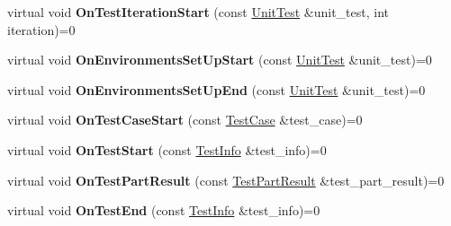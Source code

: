 \begin{DoxyCompactItemize}
\item 
\hypertarget{classtesting_1_1_test_event_listener_a60cc09b7907cb329d152eb5e7133bdeb}{}virtual void {\bfseries On\+Test\+Iteration\+Start} (const \hyperlink{classtesting_1_1_unit_test}{Unit\+Test} \&unit\+\_\+test, int iteration)=0\label{classtesting_1_1_test_event_listener_a60cc09b7907cb329d152eb5e7133bdeb}

\item 
\hypertarget{classtesting_1_1_test_event_listener_aa6502e534919605be45f26a6daf9a40c}{}virtual void {\bfseries On\+Environments\+Set\+Up\+Start} (const \hyperlink{classtesting_1_1_unit_test}{Unit\+Test} \&unit\+\_\+test)=0\label{classtesting_1_1_test_event_listener_aa6502e534919605be45f26a6daf9a40c}

\item 
\hypertarget{classtesting_1_1_test_event_listener_aaa1021d75f5dbf3f05c829c1cc520341}{}virtual void {\bfseries On\+Environments\+Set\+Up\+End} (const \hyperlink{classtesting_1_1_unit_test}{Unit\+Test} \&unit\+\_\+test)=0\label{classtesting_1_1_test_event_listener_aaa1021d75f5dbf3f05c829c1cc520341}

\item 
\hypertarget{classtesting_1_1_test_event_listener_ab4ed885d63f5bbff8076c1329b3dfe36}{}virtual void {\bfseries On\+Test\+Case\+Start} (const \hyperlink{classtesting_1_1_test_case}{Test\+Case} \&test\+\_\+case)=0\label{classtesting_1_1_test_event_listener_ab4ed885d63f5bbff8076c1329b3dfe36}

\item 
\hypertarget{classtesting_1_1_test_event_listener_ab4f6a0ca16ae75daf385b3b5914e1048}{}virtual void {\bfseries On\+Test\+Start} (const \hyperlink{classtesting_1_1_test_info}{Test\+Info} \&test\+\_\+info)=0\label{classtesting_1_1_test_event_listener_ab4f6a0ca16ae75daf385b3b5914e1048}

\item 
\hypertarget{classtesting_1_1_test_event_listener_a054f8705c883fa120b91473aff38f2ee}{}virtual void {\bfseries On\+Test\+Part\+Result} (const \hyperlink{classtesting_1_1_test_part_result}{Test\+Part\+Result} \&test\+\_\+part\+\_\+result)=0\label{classtesting_1_1_test_event_listener_a054f8705c883fa120b91473aff38f2ee}

\item 
\hypertarget{classtesting_1_1_test_event_listener_abb1c44525ef038500608b5dc2f17099b}{}virtual void {\bfseries On\+Test\+End} (const \hyperlink{classtesting_1_1_test_info}{Test\+Info} \&test\+\_\+info)=0\label{classtesting_1_1_test_event_listener_abb1c44525ef038500608b5dc2f17099b}


\end{DoxyCompactItemize}
